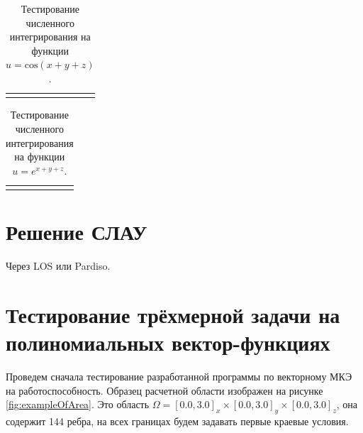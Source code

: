 \begin{table}
	\caption{Тестирование численного интегрирования на функции $u = \text{cos}(x + y + z)$.}
	\centering
	\small
	\begin{tabularx}{1.0\textwidth}{| >{\raggedright\arraybackslash}X | >{\raggedright\arraybackslash}X | >{\raggedright\arraybackslash}X |>{\raggedright\arraybackslash}X |>{\raggedright\arraybackslash}X |}
		\hline
		\centering{Аналитический результат} & \centering{Гаусс 2} & \centering{Гаусс 3} & \centering{Гаусс 4} & \centering{Гаусс 5} \tabularnewline \hline
		
		\centering{4.7666...} & \centering{4.7063579e+00}& \centering{4.7671091e+00} & \centering{4.7665835e+00} & \centering{4.7665859e+00} \tabularnewline \hline
		
	\end{tabularx}
	\label{tab:numIntegr6}
\end{table}

\begin{table}
	\caption{Тестирование численного интегрирования на функции $u = e^{x + y + z}$.}
	\centering
	\small
	\begin{tabularx}{1.0\textwidth}{| >{\raggedright\arraybackslash}X | >{\raggedright\arraybackslash}X | >{\raggedright\arraybackslash}X |>{\raggedright\arraybackslash}X |>{\raggedright\arraybackslash}X |}
		\hline
		\centering{Аналитический результат} & \centering{Гаусс 2} & \centering{Гаусс 3} & \centering{Гаусс 4} & \centering{Гаусс 5} \tabularnewline \hline
		
		\centering{12.9845...} & \centering{1.2857243e+01}& \centering{1.2983458e+01} & \centering{1.2984538e+01} & \centering{1.2984543e+01} \tabularnewline \hline
		
	\end{tabularx}
	\label{tab:numIntegr7}
\end{table}

\section{Решение СЛАУ}

Через LOS или Pardiso.

\section{Тестирование трёхмерной задачи на полиномиальных вектор-функциях}

Проведем сначала тестирование разработанной программы по векторному МКЭ на работоспособность. Образец расчетной области изображен на рисунке \ref{fig:exampleOfArea}. Это область $\Omega = [0.0, 3.0]_x \times [0.0, 3.0]_y \times [0.0, 3.0]_z$, она содержит 144 ребра, на всех границах будем задавать первые краевые условия. 

